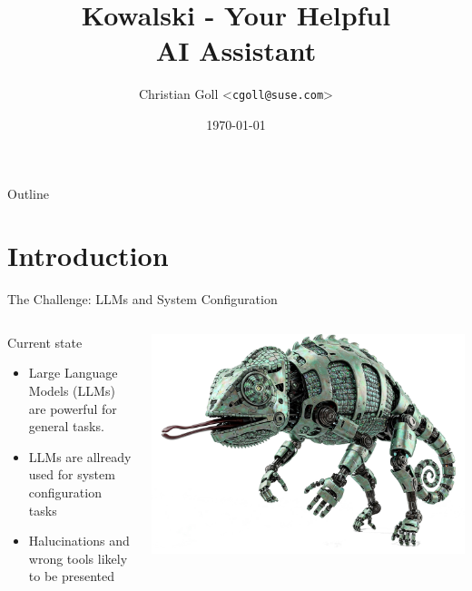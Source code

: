 \documentclass[aspectratio=169]{beamer}
\title{Kowalski - Your Helpful \\AI Assistant}
\author{Christian Goll <\texttt{cgoll@suse.com}>}
\date{\today}
\begin{document}
\begin{frame}
  \titlepage
\end{frame}

\begin{frame}{Outline}
  \tableofcontents
\end{frame}

\section{Introduction}
\begin{frame}[fragile]{The Challenge: LLMs and System Configuration}
\begin{columns}
  \begin{block}{Current state}
    \begin{itemize}
      \item Large Language Models (LLMs) are powerful for general tasks.
      \item LLMs are allready used for system configuration tasks
      \item Halucinations and wrong tools likely to be presented
    \end{itemize}
  \end{block}
  \includegraphics[width=\linewidth]{RobotChameleon}
\end{columns}
\end{frame}
\end{document}
